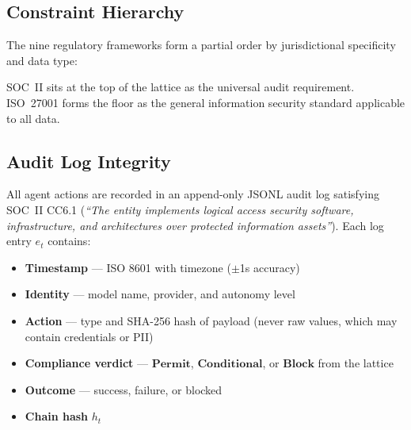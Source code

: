 \documentclass[11pt,twocolumn]{article}
\begin{document}
\subsection{Constraint Hierarchy}

The nine regulatory frameworks form a partial order by jurisdictional specificity and
data type:

\begin{center}
\end{center}

SOC~II sits at the top of the lattice as the universal audit requirement. ISO~27001
forms the floor as the general information security standard applicable to all data.

\subsection{Audit Log Integrity}
\label{sec:audit}

All agent actions are recorded in an append-only JSONL audit log satisfying
SOC~II CC6.1 (\emph{``The entity implements logical access security software,
infrastructure, and architectures over protected information assets''}).
Each log entry $e_t$ contains:

\begin{itemize}
  \item \textbf{Timestamp} — ISO 8601 with timezone ($\pm$1s accuracy)
  \item \textbf{Identity} — model name, provider, and autonomy level
  \item \textbf{Action} — type and SHA-256 hash of payload (never raw values,
        which may contain credentials or PII)
  \item \textbf{Compliance verdict} — $\mathbf{Permit}$, $\mathbf{Conditional}$,
        or $\mathbf{Block}$ from the lattice
  \item \textbf{Outcome} — success, failure, or blocked
  \item \textbf{Chain hash} $h_t$
\end{itemize}
\end{document}
